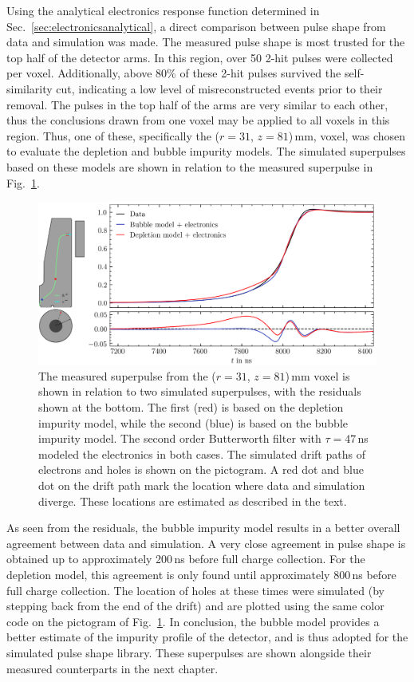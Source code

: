 Using the analytical electronics response function determined in Sec.~\ref{sec:electronicsanalytical}, a direct comparison between pulse shape from data and simulation was made. The measured pulse shape is most trusted for the top half of the detector arms. In this region, over 50 2-hit pulses were collected per voxel. Additionally, above 80\% of these 2-hit pulses survived the self-similarity cut, indicating a low level of misreconstructed events prior to their removal. The pulses in the top half of the arms are very similar to each other, thus the conclusions drawn from one voxel may be applied to all voxels in this region. Thus, one of these, specifically the ($r = 31$, $z = 81$)\,mm, voxel, was chosen to evaluate the depletion and bubble impurity models. The simulated superpulses based on these models are shown in relation to the measured superpulse in Fig.~\ref{fig:model_comparison}. 
\begin{figure}[htb]
    \centering
    \includegraphics[width=6in]{figs/sim/model_comparison.png}
    \caption{The measured superpulse from the ($r = 31$, $z = 81$)\,mm voxel is shown in relation to two simulated superpulses, with the residuals shown at the bottom. The first (red) is based on the depletion impurity model, while the second (blue) is based on the bubble impurity model. The second order Butterworth filter with $\tau = 47$\,ns modeled the electronics in both cases. The simulated drift paths of electrons and holes is shown on the pictogram. A red dot and blue dot on the drift path mark the location where data and simulation diverge. These locations are estimated as described in the text.}
    \label{fig:model_comparison}
\end{figure}

As seen from the residuals, the bubble impurity model results in a better overall agreement between data and simulation. A very close agreement in pulse shape is obtained up to approximately 200\,ns before full charge collection. For the depletion model, this agreement is only found until approximately 800\,ns before full charge collection. The location of holes at these times were simulated (by stepping back from the end of the drift) and are plotted using the same color code on the pictogram of Fig.~\ref{fig:model_comparison}. In conclusion, the bubble model provides a better estimate of the impurity profile of the detector, and is thus adopted for the simulated pulse shape library. These superpulses are shown alongside their measured counterparts in the next chapter. 


